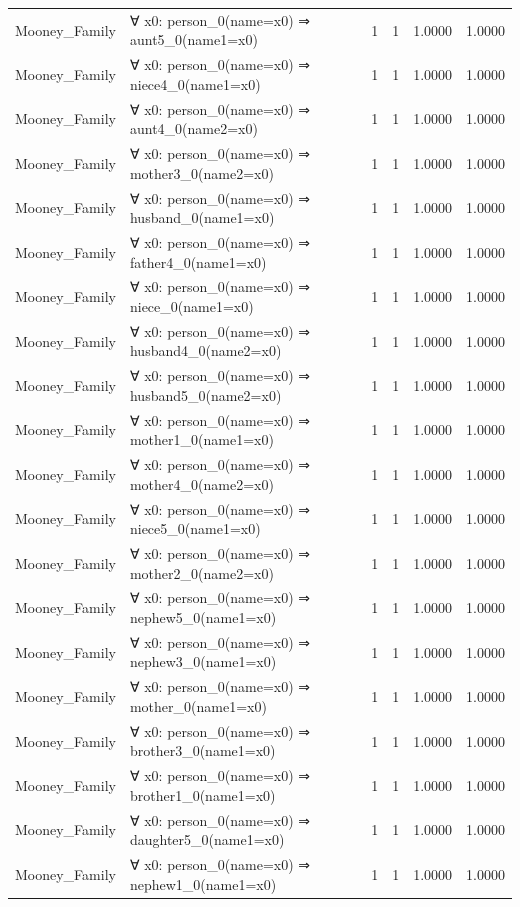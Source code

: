 \documentclass[11pt,a4paper]{article}
\begin{document}
\begin{table}[h!]
\begin{longtable}{|l|p{6cm}|c|c|c|c|}
Mooney_Family & ∀ x0: person\_0(name=x0) ⇒ aunt5\_0(name1=x0) & 1 & 1 & 1.0000 & 1.0000 \\
Mooney_Family & ∀ x0: person\_0(name=x0) ⇒ niece4\_0(name1=x0) & 1 & 1 & 1.0000 & 1.0000 \\
Mooney_Family & ∀ x0: person\_0(name=x0) ⇒ aunt4\_0(name2=x0) & 1 & 1 & 1.0000 & 1.0000 \\
Mooney_Family & ∀ x0: person\_0(name=x0) ⇒ mother3\_0(name2=x0) & 1 & 1 & 1.0000 & 1.0000 \\
Mooney_Family & ∀ x0: person\_0(name=x0) ⇒ husband\_0(name1=x0) & 1 & 1 & 1.0000 & 1.0000 \\
Mooney_Family & ∀ x0: person\_0(name=x0) ⇒ father4\_0(name1=x0) & 1 & 1 & 1.0000 & 1.0000 \\
Mooney_Family & ∀ x0: person\_0(name=x0) ⇒ niece\_0(name1=x0) & 1 & 1 & 1.0000 & 1.0000 \\
Mooney_Family & ∀ x0: person\_0(name=x0) ⇒ husband4\_0(name2=x0) & 1 & 1 & 1.0000 & 1.0000 \\
Mooney_Family & ∀ x0: person\_0(name=x0) ⇒ husband5\_0(name2=x0) & 1 & 1 & 1.0000 & 1.0000 \\
Mooney_Family & ∀ x0: person\_0(name=x0) ⇒ mother1\_0(name1=x0) & 1 & 1 & 1.0000 & 1.0000 \\
Mooney_Family & ∀ x0: person\_0(name=x0) ⇒ mother4\_0(name2=x0) & 1 & 1 & 1.0000 & 1.0000 \\
Mooney_Family & ∀ x0: person\_0(name=x0) ⇒ niece5\_0(name1=x0) & 1 & 1 & 1.0000 & 1.0000 \\
Mooney_Family & ∀ x0: person\_0(name=x0) ⇒ mother2\_0(name2=x0) & 1 & 1 & 1.0000 & 1.0000 \\
Mooney_Family & ∀ x0: person\_0(name=x0) ⇒ nephew5\_0(name1=x0) & 1 & 1 & 1.0000 & 1.0000 \\
Mooney_Family & ∀ x0: person\_0(name=x0) ⇒ nephew3\_0(name1=x0) & 1 & 1 & 1.0000 & 1.0000 \\
Mooney_Family & ∀ x0: person\_0(name=x0) ⇒ mother\_0(name1=x0) & 1 & 1 & 1.0000 & 1.0000 \\
Mooney_Family & ∀ x0: person\_0(name=x0) ⇒ brother3\_0(name1=x0) & 1 & 1 & 1.0000 & 1.0000 \\
Mooney_Family & ∀ x0: person\_0(name=x0) ⇒ brother1\_0(name1=x0) & 1 & 1 & 1.0000 & 1.0000 \\
Mooney_Family & ∀ x0: person\_0(name=x0) ⇒ daughter5\_0(name1=x0) & 1 & 1 & 1.0000 & 1.0000 \\
Mooney_Family & ∀ x0: person\_0(name=x0) ⇒ nephew1\_0(name1=x0) & 1 & 1 & 1.0000 & 1.0000 \\

\end{longtable}
\end{table}
\end{document}
